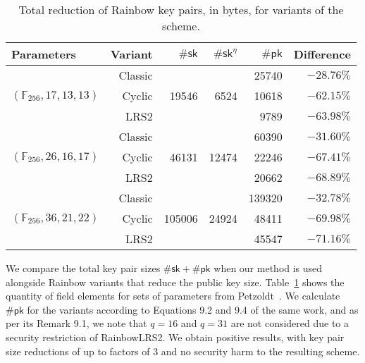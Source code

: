 \documentclass[draft, 12pt, a4paper, oneside]{memoir}
\theoremstyle{definition}
\begin{document}
\begin{table}[htbp]
  \renewcommand{\arraystretch}{1.2}
  \centering
  \caption{Total reduction of Rainbow key pairs, in bytes, for variants of the scheme.}\label{tab:2}
  \begin{tabular}{l*{5}{r}}
    \toprule
    Parameters & Variant & $\#\mathsf{sk}$ & $\#\mathsf{sk}^{\eta}$ & $\#\mathsf{pk}$ & Difference \\ \midrule
    \multirow{3}{*}{$(\mathbb{F}_{256}, 17, 13, 13)$}  &  Classic &  \multirow{3}{*}{ 19546} &  \multirow{3}{*}{ 6524} &   25740 & $-28.76\%$ \\
                                                       &   Cyclic &                          &                         &   10618 & $-62.15\%$ \\
                                                       &     LRS2 &                          &                         &    9789 & $-63.98\%$ \\
    \multirow{3}{*}{$(\mathbb{F}_{256}, 26, 16, 17)$}  &  Classic &  \multirow{3}{*}{ 46131} &  \multirow{3}{*}{12474} &   60390 & $-31.60\%$ \\
                                                       &   Cyclic &                          &                         &   22246 & $-67.41\%$ \\
                                                       &     LRS2 &                          &                         &   20662 & $-68.89\%$ \\
    \multirow{3}{*}{$(\mathbb{F}_{256}, 36, 21, 22)$}  &  Classic &  \multirow{3}{*}{105006} &  \multirow{3}{*}{24924} &  139320 & $-32.78\%$ \\
                                                       &   Cyclic &                          &                         &   48411 & $-69.98\%$ \\
                                                       &     LRS2 &                          &                         &   45547 & $-71.16\%$ \\
    \bottomrule
  \end{tabular}
\end{table}

We compare the total key pair sizes $\#\mathsf{sk} + \#\mathsf{pk}$
when our method is used alongside Rainbow variants that reduce the public key
size. Table~\ref{tab:2} shows the quantity of field elements for sets of
parameters from Petzoldt~\cite[Table 9.8]{Petzoldt:201307}. We calculate
$\#\mathsf{pk}$ for the variants according to Equations 9.2 and 9.4 of the
same work, and as per its Remark 9.1, we note that $q = 16$ and $q = 31$ are not
considered due to a security restriction of RainbowLRS2. We obtain positive
results, with key pair size reductions of up to factors of 3 and no security
harm to the resulting scheme.
\end{document}
